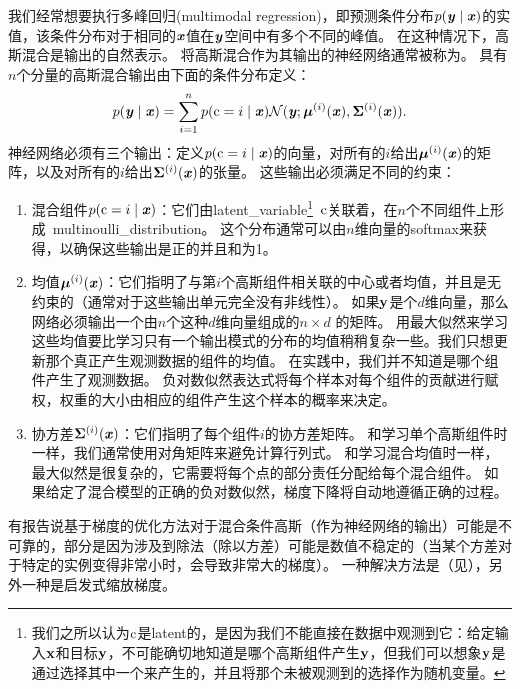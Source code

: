 
我们经常想要执行多峰回归(multimodal regression)，即预测条件分布$p(\boldsymbol{\mathit{y}}\mid\boldsymbol{\mathit{x}})$的实值，该条件分布对于相同的$\boldsymbol{\mathit{x}}$值在$\boldsymbol{\mathit{y}}$空间中有多个不同的峰值。
在这种情况下，高斯混合是输出的自然表示\citep{Jacobs-nc91,bishop1994mixture}。
将高斯混合作为其输出的神经网络通常被称为。
具有$n$个分量的高斯混合输出由下面的条件分布定义：
\begin{equation}
p(\boldsymbol{\mathit{y}}\mid\boldsymbol{\mathit{x}}) = \sum_{i=1}^n p(\mathrm{c} = i \mid \boldsymbol{\mathit{x}}) \mathcal{N}(\boldsymbol{\mathit{y}}; \boldsymbol{\mu}^{(i)}(\boldsymbol{\mathit{x}}), \boldsymbol{\Sigma}^{(i)}(\boldsymbol{\mathit{x}})).
\end{equation}
神经网络必须有三个输出：定义$p(\mathrm{c}=i\mid\boldsymbol{\mathit{x}})$的向量，对所有的$i$给出$\boldsymbol{\mu}^{(i)}(\boldsymbol{\mathit{x}})$的矩阵，以及对所有的$i$给出$\boldsymbol{\Sigma}^{(i)}(\boldsymbol{\mathit{x}})$的张量。
这些输出必须满足不同的约束：
\begin{enumerate}
\item 混合组件$p(\mathrm{c}=i\mid\boldsymbol{\mathit{x}})$：它们由\gls{latent_variable}\footnote{我们之所以认为$\mathrm{c}$是\gls{latent}的，是因为我们不能直接在数据中观测到它：给定输入$\mathbf{x}$和目标$\mathbf{y}$，不可能确切地知道是哪个高斯组件产生$\mathbf{y}$，但我们可以想象$\mathbf{y}$是通过选择其中一个来产生的，并且将那个未被观测到的选择作为随机变量。}~$\mathrm{c}$关联着，在$n$个不同组件上形成~\gls{multinoulli_distribution}。
这个分布通常可以由$n$维向量的softmax来获得，以确保这些输出是正的并且和为1。

\item 均值$\boldsymbol{\mu}^{(i)}(\boldsymbol{\mathit{x}})$：它们指明了与第$i$个高斯组件相关联的中心或者均值，并且是无约束的（通常对于这些输出单元完全没有非线性）。
如果$\mathbf{y}$是个$d$维向量，那么网络必须输出一个由$n$个这种$d$维向量组成的$n\times d$ 的矩阵。
用最大似然来学习这些均值要比学习只有一个输出模式的分布的均值稍稍复杂一些。我们只想更新那个真正产生观测数据的组件的均值。
在实践中，我们并不知道是哪个组件产生了观测数据。
负对数似然表达式将每个样本对每个组件的贡献进行赋权，权重的大小由相应的组件产生这个样本的概率来决定。

\item 协方差$\boldsymbol{\Sigma}^{(i)}(\boldsymbol{\mathit{x}})$：它们指明了每个组件$i$的协方差矩阵。
和学习单个高斯组件时一样，我们通常使用对角矩阵来避免计算行列式。
和学习混合均值时一样，最大似然是很复杂的，它需要将每个点的部分责任分配给每个混合组件。
如果给定了混合模型的正确的负对数似然，梯度下降将自动地遵循正确的过程。
\end{enumerate}
有报告说基于梯度的优化方法对于混合条件高斯（作为神经网络的输出）可能是不可靠的，部分是因为涉及到除法（除以方差）可能是数值不稳定的（当某个方差对于特定的实例变得非常小时，会导致非常大的梯度）。
一种解决方法是（见），另外一种是启发式缩放梯度\citep{Uria+al-ICML2014}。

